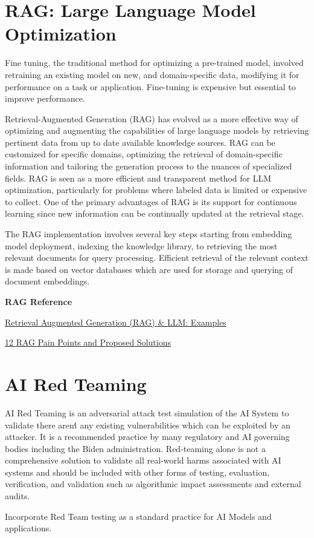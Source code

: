 \section{RAG: Large Language Model Optimization}
Fine tuning, the traditional method for optimizing a pre-trained model, involved retraining an existing model on new, and domain-specific data, modifying it for performance on a task or application. Fine-tuning is expensive but essential to improve performance.

Retrieval-Augmented Generation (RAG) has evolved as a more effective way of optimizing and augmenting the capabilities of large language models by retrieving pertinent data from up to date available knowledge sources. RAG can be customized for specific domains, optimizing the retrieval of domain-specific information and tailoring the generation process to the nuances of specialized fields​​. RAG is seen as a more efficient and transparent method for LLM optimization, particularly for problems where labeled data is limited or expensive to collect. One of the primary advantages of RAG is its support for continuous learning since new information can be continually updated at the retrieval stage.

The RAG implementation involves several key steps starting from embedding model deployment, indexing the knowledge library, to retrieving the most relevant documents for query processing. Efficient retrieval of the relevant context is made based on vector databases which are used for storage and querying of document embeddings.

\textbf{RAG Reference}

\begin{minipage}{\linewidth}
\begin{checklist}
  \item \href{https://vitalflux.com/retrieval-augmented-generation-rag-llm-examples/}{Retrieval Augmented Generation (RAG) \& LLM: Examples}
  \item \href{https://towardsdatascience.com/12-rag-pain-points-and-proposed-solutions-43709939a28c}{12 RAG Pain Points and Proposed Solutions}
\end{checklist}
\end{minipage}

\section{AI Red Teaming}
AI Red Teaming is an adversarial attack test simulation of the AI System to validate there aren\'t any existing vulnerabilities which can be exploited by an attacker. It is a recommended practice by many regulatory and AI governing bodies including the Biden administration. Red-teaming alone is not a comprehensive solution to validate all real-world harms associated with AI systems and should be included with other forms of testing, evaluation, verification, and validation such as algorithmic impact assessments and external audits.

\begin{minipage}{\linewidth}
\begin{checklist}
  \item Incorporate Red Team testing as a standard practice for AI Models and
  applications.
\end{checklist}
\end{minipage}